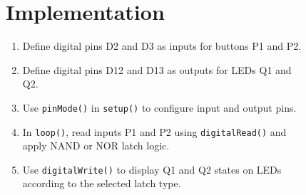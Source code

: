 \documentclass[12pt,a4paper]{article}
\begin{document}
\begin{figure}[H]
  \centering
  \begin{minipage}[t]{0.48\textwidth}
    \section*{Implementation}
    \small
    \begin{enumerate}[left=0pt]
      \item Define digital pins D2 and D3 as inputs for buttons P1 and P2.
      \item Define digital pins D12 and D13 as outputs for LEDs Q1 and Q2.
      \item Use \texttt{pinMode()} in \texttt{setup()} to configure input and output pins.
      \item In \texttt{loop()}, read inputs P1 and P2 using \texttt{digitalRead()} and apply NAND or NOR latch logic.
      \item Use \texttt{digitalWrite()} to display Q1 and Q2 states on LEDs according to the selected latch type.
    \end{enumerate}
  \end{minipage}\hfill
  \begin{minipage}[t]{0.48\textwidth}
  \end{minipage}
\end{figure}
\end{document}
